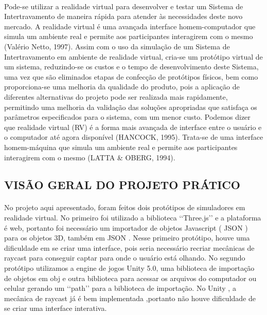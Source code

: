 \documentclass[12pt,a4paper]{article}
\begin{document}
\paragraph{}
Pode-se utilizar a realidade virtual para desenvolver e testar um Sistema de
Intertravamento de maneira rápida para atender às necessidades deste novo mercado. A
realidade virtual é uma avançada interface homem-computador que simula um ambiente real e
permite aos participantes interagirem com o mesmo (Valério Netto, 1997). Assim com o uso da
simulação de um Sistema de Intertravamento em ambiente de realidade virtual, cria-se um
protótipo virtual de um sistema, reduzindo-se os custos e o tempo de desenvolvimento deste
Sistema, uma vez que são eliminados etapas de confecção de protótipos físicos, bem como
proporciona-se uma melhoria da qualidade do produto, pois a aplicação de diferentes
alternativas do projeto pode ser realizada mais rapidamente, permitindo uma melhoria da
validação das soluções apropriadas que satisfaça os parâmetros especificados para o sistema,
com um menor custo. Podemos dizer que realidade virtual (RV) \cite{wiki:virtual_reality} é a forma mais avançada de interface entre o usuário e o computador até agora disponível
(HANCOCK, 1995). Trata-se de uma interface homem-máquina que simula um ambiente real e
permite aos participantes interagirem com o mesmo (LATTA \& OBERG, 1994). 


\subsection{VISÃO GERAL DO PROJETO PRÁTICO}
\paragraph{}
No projeto aqui apresentado, foram feitos dois protótipos de simuladores em realidade virtual. No primeiro foi utilizado a biblioteca ‘‘Three.js’’ \cite{wiki:threejs} e a plataforma é web, portanto foi necessário um importador de objetos Javascript ( JSON ) \cite{wiki:json} para os objetos 3D, também em JSON \cite{wiki:json}. Nesse primeiro protótipo, houve uma dificuldade em se
criar uma interface, pois seria necessário recriar mecânicas de raycast para conseguir captar para onde o usuário está olhando. No segundo protótipo utilizamos a engine de jogos Unity \cite{wiki.city} 5.0, uma biblioteca de importação de objetos em obj e outra biblioteca para acessar os arquivos do computador ou celular gerando um ‘‘path’’  para a biblioteca de importação. No Unity \cite{wiki:unity}, a mecânica de raycast já é bem implementada
,portanto não houve dificuldade de se criar uma interface interativa. 
\end{document}
